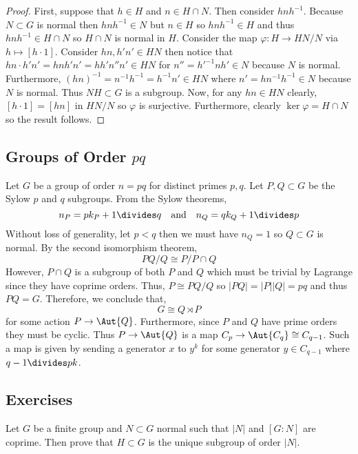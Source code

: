 \documentclass[12pt]{article}
\begin{document}
\begin{proof}
First, suppose that $h \in H$ and $n \in H \cap N$. Then consider $h n h^{-1}$. Because $N \subset G$ is normal then $h n h^{-1} \in N$ but $n \in H$ so $h n h^{-1} \in H$ and thus $h n h^{-1} \in H \cap N$ so $H \cap N$ is normal in $H$. 
Consider the map $\varphi : H \to HN / N$ via $h \mapsto [h \cdot 1]$. Consider $hn, h'n' \in HN$ then notice that $hn \cdot h'n' = h n h' n' = h h' n'' n' \in HN$ for $n'' = h'^{-1} n h' \in N$ because $N$ is normal. Furthermore, $(h n)^{-1} = n^{-1} h^{-1} = h^{-1} n' \in HN$ where $n' = h n^{-1} h^{-1} \in N$ because $N$ is normal. Thus $NH \subset G$ is a subgroup. Now, for any $hn \in HN$ clearly, $[h \cdot 1] = [hn]$ in $HN / N$ so $\varphi$ is surjective. Furthermore, clearly $\ker{\varphi} = H \cap N$ so the result follows.
\end{proof}

\subsection{Groups of Order $pq$}

Let $G$ be a group of order $n = pq$ for distinct primes $p,q$. Let $P, Q \subset G$ be the Sylow $p$ and $q$ subgroups. From the Sylow theorems,
\[ n_P = p k_P + 1 \divides q \quad \text{and} \quad n_Q = q k_Q + 1 \divides p \]
Without loss of generality, let $p < q$ then we must have $n_Q = 1$ so $Q \subset G$ is normal.
By the second isomorphism theorem,
\[ PQ/Q \cong P / P \cap Q \]
However, $P \cap Q$ is a subgroup of both $P$ and $Q$ which must be trivial by Lagrange since they have coprime orders. Thus, $P \cong PQ / Q$ so $|PQ| = |P| |Q| = p q$ and thus $PQ = G$. Therefore, we conclude that,
\[ G \cong Q \rtimes P \]
for some action $P \to \Aut{Q}$. Furthermore, since $P$ and $Q$ have prime orders they must be cyclic. Thus $P \to \Aut{Q}$ is a map $C_p \to \Aut{C_q} \cong C_{q-1}$. Such a map is given by sending a generator $x$ to $y^k$ for some generator $y \in C_{q-1}$ where $q - 1 \divides p k$.

\subsection{Exercises}

\begin{exercise}
Let $G$ be a finite group and $N \subset G$ normal such that $|N|$ and $[G : N]$ are coprime. Then prove that $H \subset G$ is the unique subgroup of order $|N|$.
\end{exercise}
\end{document}
